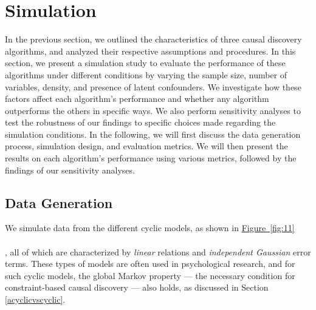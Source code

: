 \documentclass[twoside, 11pt]{article}
\newcommand*{\figref}[2][]{%
  \hyperref[{fig:#2}]{%
    Figure~\ref*{fig:#2}%
    \ifx\\#1\\%
    \else
      #1%
    \fi
  }%
}
\begin{document}

\newpage
\section{Simulation} \label{simulation}

In the previous section, we outlined the characteristics of three causal discovery algorithms, and analyzed their respective assumptions and procedures. In this section, we present a simulation study to evaluate the performance of these algorithms under different conditions by varying the sample size, number of variables, density, and presence of latent confounders. We investigate how these factors affect each algorithm's performance and whether any algorithm outperforms the others in specific ways. We also perform sensitivity analyses to test the robustness of our findings to specific choices made regarding the simulation conditions. In the following, we will first discuss the data generation process, simulation design, and evaluation metrics. We will then present the results on each algorithm's performance using various metrics, followed by the findings of our sensitivity analyses.



\subsection{Data Generation}
We simulate data from the different cyclic models, as shown in \figref[]{11}, all of which are characterized by \textit{linear} relations and \textit{independent Gaussian} error terms. These types of models are often used in psychological research, and for such cyclic models, the global Markov property --- the necessary condition for constraint-based causal discovery --- also holds, as discussed in Section \ref{acyclicvscyclic}.
\end{document}
